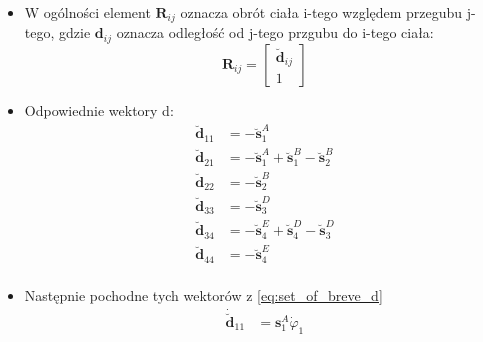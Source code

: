 \begin{itemize}
\begin{equation}
\begin{aligned}
            \varphi_3 &= \varphi_4+\theta_3 && \boldsymbol{r}_3 = \boldsymbol{r}_4 + \boldsymbol{s}_4^D-\boldsymbol{s}_3^D\\
            \varphi_4 &= \theta_4 && \boldsymbol{r}_4 = \boldsymbol{r}_0^E-\boldsymbol{s}_4^E\\
            \end{aligned}
        \end{equation}
    \item W ogólności element $\boldsymbol{R}_{ij}$ oznacza obrót ciała i-tego względem przegubu j-tego, gdzie $\boldsymbol{d}_{ij}$ oznacza odległość od j-tego przgubu do i-tego ciała:
        \begin{equation}
            \label{eq:rij}
                \boldsymbol{R}_{ij}
                =
                \begin{bmatrix}
                    \boldsymbol{\breve d}_{ij}\\1
                \end{bmatrix}
        \end{equation}
    \item Odpowiednie wektory d:
        \begin{equation}
            \label{eq:set_of_breve_d}
            \begin{aligned}
             \boldsymbol{\breve d}_{11}& = -\boldsymbol{\breve s}_1^A\\
             \boldsymbol{\breve d}_{21}&=-\boldsymbol{\breve s}_1^A+\boldsymbol{\breve s}_1^B-\boldsymbol{\breve s}_2^B\\
             \boldsymbol{\breve d}_{22}&=-\boldsymbol{\breve s}_2^B\\
             \boldsymbol{\breve d}_{33}&=-\boldsymbol{\breve s}_3^D\\
             \boldsymbol{\breve d}_{34}&=-\boldsymbol{\breve s}_4^E+\boldsymbol{\breve s}_4^D-\boldsymbol{\breve s}_3^D\\
             \boldsymbol{\breve d}_{44}&=-\boldsymbol{\breve s}_4^E\\
            \end{aligned}
        \end{equation}
    \item Następnie pochodne tych wektorów z \ref{eq:set_of_breve_d}
        \begin{equation}
            \label{eq:diff_set_of_breve_d}
            \begin{aligned}
             \boldsymbol{\dot{\breve{d}}}_{11}& = \boldsymbol{s}_1^A\dot \varphi_1\\

\end{aligned}
\end{equation}
\end{itemize}
